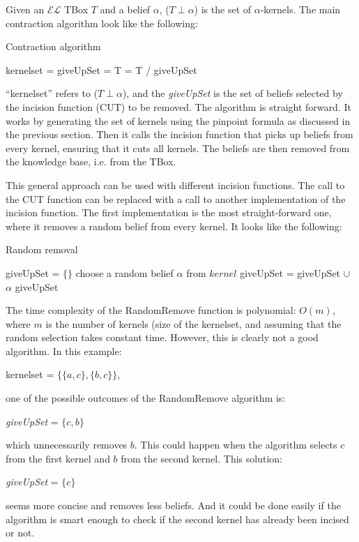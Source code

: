 Given an $\mathcal{EL}$ TBox $T$ and a belief $\alpha$, ($T \perp \alpha$) is the set of $\alpha$-kernels. The main contraction algorithm look like the following:

\begin{algorithm}
\caption{Contraction algorithm}
\label{MainAlgorithm}
\begin{algorithmic}[1]
\State kernelset = 
\State giveUpSet = 
\State T = T / giveUpSet
\EndProcedure
\end{algorithmic}
\end{algorithm}

``kernelset'' refers to ($T \perp \alpha$), and the \textit{giveUpSet} is the set of beliefs selected by the incision function (CUT) to be removed. The algorithm is straight forward. It works by generating the set of kernels using the pinpoint formula as discussed in the previous section. Then it calls the incision function that picks up beliefs from every kernel, ensuring that it cuts all kernels. The beliefs are then removed from the knowledge base, i.e. from the TBox.

This general approach can be used with different incision functions. The call to the CUT function can be replaced with a call to another implementation of the incision function. The first implementation is the most straight-forward one, where it removes a random belief from every kernel. It looks like the following:

\begin{algorithm}
\caption{Random removal}
\label{RandomAlgorithm}
\begin{algorithmic}[1]
\State giveUpSet = $\lbrace \rbrace$
\State choose a random belief $\alpha$ from $kernel$
\State giveUpSet = giveUpSet $\cup$ $\alpha$
\EndFor \State
\Return giveUpSet
\EndFunction
\end{algorithmic}
\end{algorithm}

The time complexity of the RandomRemove function is polynomial: $O(m)$, where $m$ is the number of kernels (size of the kernelset, and assuming that the random selection takes constant time. However, this is clearly not a good algorithm. In this example:
\begin{center}
kernelset = $\lbrace \lbrace a, c \rbrace, \lbrace b, c \rbrace \rbrace$, 
\end{center}
one of the possible outcomes of the RandomRemove algorithm is:
\begin{center}
\textit{giveUpSet} = $\lbrace c, b \rbrace$
\end{center}
which unnecessarily removes $b$. This could happen when the algorithm selects $c$ from the first kernel and $b$ from the second kernel. This solution:
\begin{center}
\textit{giveUpSet} = $\lbrace c \rbrace$
\end{center}
seems more concise and removes less beliefs. And it could be done easily if the algorithm is smart enough to check if the second kernel has already been incised or not. 

